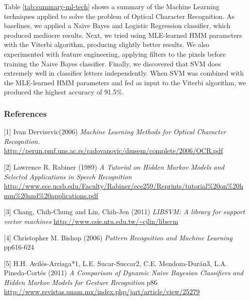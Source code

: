 \documentclass{article} %
\begin{document}
Table \ref{tab:summary-ml-tech} shows a summary of the Machine Learning techniques applied to solve the problem of Optical Character Recognition. As baselines, we applied a Naive Bayes and Logistic Regression classifier, which produced mediocre results. Next, we tried using MLE-learned HMM parameters with the Viterbi algorithm, producing slightly better results. We also experimented with feature engineering, applying filters to the pixels before training the Naive Bayes classifier. Finally, we discovered that SVM does extremely well in classifier letters independently. When SVM was combined with the MLE-learned HMM parameters and fed as input to the Viterbi algorithm, we produced the highest accuracy of 91.5\%.

\subsubsection*{References}

\small{
[1] Ivan Dervisevic(2006) {\it Machine Learning Methods for Optical Character Recognition.} \url{http://perun.pmf.uns.ac.rs/radovanovic/dmsem/complete/2006/OCR.pdf}

[2] Lawrence R. Rabiner (1989) {\it A Tutorial on Hidden Markov Models and Selected Applications in Speech Recognition} \url{http://www.ece.ucsb.edu/Faculty/Rabiner/ece259/Reprints/tutorial\%20on\%20hmm\%20and\%20applications.pdf}

[3] Chang, Chih-Chung and Lin, Chih-Jen (2011) {\it LIBSVM: A library for support vector machines } \url{http://www.csie.ntu.edu.tw/~cjlin/libsvm}

[4] Christopher M. Bishop (2006) {\it Pattern Recognition and Machine Learning} pp616-624

[5] H.H. Avilés-Arriaga*1, L.E. Sucar-Succar2, C.E. Mendoza-Durán3, L.A. Pineda-Cortés (2011) {\it A Comparison of Dynamic Naive Bayesian Classifiers and Hidden Markov Models for Gesture Recognition} p86 \url{http://www.revistas.unam.mx/index.php/jart/article/view/25279}

}
\end{document}
